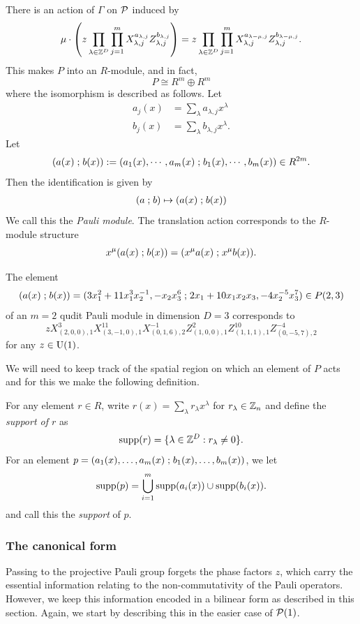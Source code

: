 \documentclass[11pt]{amsart}
\begin{document}
There is an action of $\Gamma$ on $\mathcal{P}$ induced by
\[ \mu \cdot \left(z   \prod_{\lambda \in \mathbb{Z}^D} \prod_{j =1}^m X_{\lambda,j}^{a_{\lambda,j}}   Z_{\lambda,j}^{b_{\lambda,j}} \right)  = z   \prod_{\lambda \in \mathbb{Z}^D} \prod_{j =1}^m X_{\lambda,j}^{a_{\lambda-\mu,j}}  Z_{\lambda,j}^{b_{\lambda-\mu,j}}  .\]
This makes $P$ into an $R$-module, and in fact,
\[P \cong R^{m}\oplus R^m\]
where the isomorphism is described as follows. Let
\begin{align*}
a_j(x) &= \sum_{\lambda} a_{\lambda,j} x^\lambda  \\
b_j(x) &= \sum_{\lambda} b_{\lambda,j} x^\lambda .
\end{align*}
Let
\[ (a(x) \mathrel{;} b(x)) := \left( a_1(x), \cdots, a_m(x)  \mathrel{;}  b_1(x), \cdots, b_m(x) \right) \in R^{2m}. \]
Then the identification is given by
\begin{align*}
(a  \mathrel{;} b ) \mapsto  (a(x) \mathrel{;} b(x))
\end{align*}
We call this the \emph{Pauli module}. The translation action corresponds to the $R$-module structure
\[x^\mu(a(x) \mathrel{;} b(x)) = (x^\mu a(x) \mathrel{;} x^\mu b(x)).  \]




\begin{example}
The element
\[  (a(x) \mathrel{;} b(x)) = (3 x_1^2+11 x_1^3x_2^{-1}, -x_2x_3^6 \mathrel{;} 2x_1 +10x_1x_2x_3, -4x_2^{-5}x_3^7 ) \in P(2,3)\]
of an $m=2$ qudit Pauli module in dimension $D=3$ corresponds to
\[  z X_{(2,0,0),1}^3 X_{(3,-1,0),1}^{11}  X_{(0,1,6),2}^{-1} Z_{(1,0,0),1}^2 Z_{(1,1,1),1}^{10} Z_{(0,-5,7),2}^{-4}  \]
for any $z\in \rm U(1)$.
\end{example}

We will need to keep track of the spatial region on which an element of $P$ acts and for this we make the following definition.
\begin{defn}
For any element $r\in R$, write $r(x) = \sum_{\lambda}r_{\lambda}x^\lambda$ for $r_\lambda\in \mathbb{Z}_n$ and define the \emph{support of $r$} as
\[ \mathrm{supp}(r)= \{\lambda\in\mathbb{Z}^D : r_{\lambda}\neq 0\}.\]
For an element $p = (a_1(x),\ldots, a_m(x) \mathrel{;} b_1(x),\ldots, b_m(x))$, we let
\[\mathrm{supp}(p) = \bigcup_{i=1}^m \mathrm{supp}(a_i(x))\cup  \mathrm{supp}(b_i(x)).\]
and call this the \emph{support} of $p$.
\end{defn}

\subsubsection{The canonical form}

Passing to the projective Pauli group forgets the phase factors $z$, which carry the essential information relating to the non-commutativity of the Pauli operators. However, we keep this information encoded in a bilinear form as described in this section. Again, we start by describing this in the easier case of $\mathcal{P}(1)$.
\end{document}
